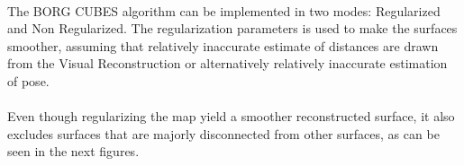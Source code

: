 \documentclass[11pt]{article}
\begin{document}
	\paragraph{}
	The BORG CUBES algorithm can be implemented in two modes: Regularized and Non Regularized. The regularization parameters is used to make the surfaces smoother, assuming that relatively inaccurate estimate of distances are drawn from the Visual Reconstruction or alternatively relatively inaccurate estimation of pose.
	
	\paragraph{}
	Even though regularizing the map yield a smoother reconstructed surface, it also excludes surfaces that are majorly disconnected from other surfaces, as can be seen in the next figures.
	
\end{document}
